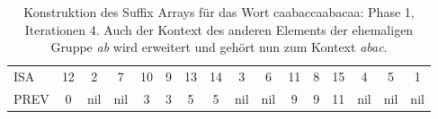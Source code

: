 \begin{table}[H]
\begin{adjustbox}{max width=\textwidth}
\begin{tabular}{lccccccccccccccc}
\multicolumn{1}{l|}{ISA}     & 12                      & 2   & 7   & 10 & 9                       & 13                                                & 14                         & 3                         & 6                        & 11 & 8                         & 15  & 4   & 5   & 1   \\
\multicolumn{1}{l|}{PREV}    & 0                       & nil & nil & 3  & 3                       & 5                                                 & 5                          & nil                       & nil                      & 9  & \cellcolor[HTML]{\red}9 & 11  & nil & nil & nil
\end{tabular}
\end{adjustbox}

\caption[Konstruktion des Suffix Arrays f{\"u}r das Wort caabaccaabacaa: Phase 1, Iterationen 4]{Konstruktion des Suffix Arrays f{\"u}r das Wort caabaccaabacaa: Phase 1, Iterationen 4. Auch der Kontext des anderen Elements der ehemaligen Gruppe \textit{ab} wird erweitert und geh{\"o}rt nun zum Kontext \textit{abac}.}
\label{table_complex_example_1_4} 
\end{table}

